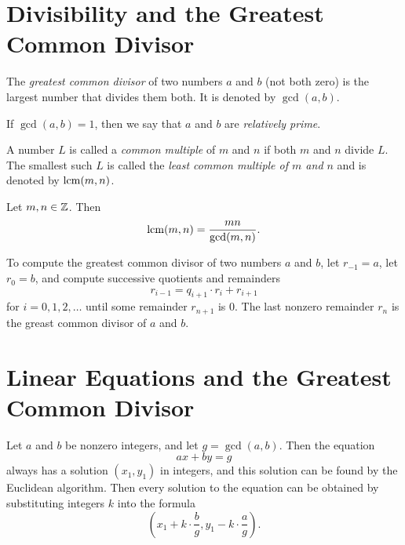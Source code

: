 \documentclass[10pt]{article}
\begin{document}
\section{Divisibility and the Greatest Common Divisor}

\begin{definition*}[\textcolor{red}{Greatest Common Divisor}] The \emph{greatest common divisor} of two numbers $a$ and $b$ (not both zero) is the largest number that divides them both. It is denoted by $\gcd(a,b)$.
\end{definition*}

\begin{definition*}[\textcolor{red}{Relatively Prime}] If $\gcd(a,b)=1$, then we say that $a$ and $b$ are \emph{relatively prime}.
\end{definition*}

\begin{definition*}[\textcolor{red}{Least Common Multiple}] A number $L$ is called a \emph{common multiple} of $m$ and $n$ if both $m$ and $n$ divide $L$. The smallest such $L$ is called the \emph{least common multiple of $m$ and $n$} and is denoted by $\operatorname{lcm}(m,n)$.
\end{definition*}

\begin{theorem*}Let $m,n \in \mathbb{Z}$. Then
    \[\operatorname{lcm}(m,n) = \frac{mn}{\gcd(m,n)}.\]
\end{theorem*}

\begin{theorem}[\textcolor{red}{Euclidean Algorithm}] To compute the greatest common divisor of two numbers $a$ and $b$, let $r_{-1} = a$, let $r_0=b$, and compute successive quotients and remainders
    \[r_{i-1} = q_{i+1} \cdot r_i + r_{i+1}\]
for $i=0,1,2,\ldots$ until some remainder $r_{n+1}$ is $0$. The last nonzero remainder $r_n$ is the greast common divisor of $a$ and $b$.
\end{theorem}


\section{Linear Equations and the Greatest Common Divisor}

\begin{theorem}[\textcolor{red}{Linear Equation Theorem}] Let $a$ and $b$ be nonzero integers,
    and let $g=\gcd(a,b)$. Then the equation
    \[ax+by=g\]
    always has a solution $(x_1,y_1)$ in integers, and this solution can be found by the Euclidean algorithm. Then every solution to the equation can be obtained by substituting integers $k$ into the formula
    \[\left( x_1 + k \cdot \frac{b}{g}, y_1-k \cdot \frac{a}{g} \right).\]
\end{theorem}
\end{document}

